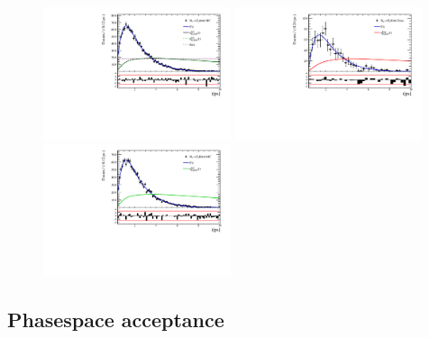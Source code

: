 \begin{figure}[h]
\includegraphics[height=!,width=0.49\textwidth]{figs/Acceptance/adaptive_N4/timeAccRatioFit_norm_mc_Run2_t1.pdf}
\includegraphics[height=!,width=0.49\textwidth]{figs/Acceptance/adaptive_N4/timeAccRatioFit_signal_B0_Run2_t1.pdf}
\includegraphics[height=!,width=0.49\textwidth]{figs/Acceptance/adaptive_N4/timeAccRatioFit_signal_mc_Run2_t1.pdf}
\caption{}
\label{fig:}
\end{figure}

\clearpage
\subsection{Phasespace acceptance}
\label{sec:phasespaceAcceptance}
